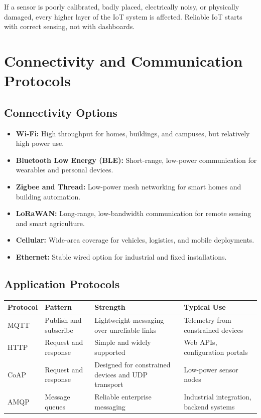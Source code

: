 \documentclass[11pt,a4paper]{article}
\begin{document}
\begin{alertbox}
If a sensor is poorly calibrated, badly placed, electrically noisy, or physically damaged, every higher layer of the IoT system is affected. Reliable IoT starts with correct sensing, not with dashboards.
\end{alertbox}

\section{Connectivity and Communication Protocols}

\subsection{Connectivity Options}

\begin{itemize}[leftmargin=*]
  \item \textbf{Wi-Fi:} High throughput for homes, buildings, and campuses, but relatively high power use.
  \item \textbf{Bluetooth Low Energy (BLE):} Short-range, low-power communication for wearables and personal devices.
  \item \textbf{Zigbee and Thread:} Low-power mesh networking for smart homes and building automation.
  \item \textbf{LoRaWAN:} Long-range, low-bandwidth communication for remote sensing and smart agriculture.
  \item \textbf{Cellular:} Wide-area coverage for vehicles, logistics, and mobile deployments.
  \item \textbf{Ethernet:} Stable wired option for industrial and fixed installations.
\end{itemize}

\subsection{Application Protocols}

\begin{longtable}{p{2.3cm}p{2.5cm}p{4.0cm}p{3.9cm}}
\toprule
\textbf{Protocol} & \textbf{Pattern} & \textbf{Strength} & \textbf{Typical Use} \\
\midrule
MQTT & Publish and subscribe & Lightweight messaging over unreliable links & Telemetry from constrained devices \\
HTTP & Request and response & Simple and widely supported & Web APIs, configuration portals \\
CoAP & Request and response & Designed for constrained devices and UDP transport & Low-power sensor nodes \\
AMQP & Message queues & Reliable enterprise messaging & Industrial integration, backend systems \\
\bottomrule
\end{longtable}
\end{document}
